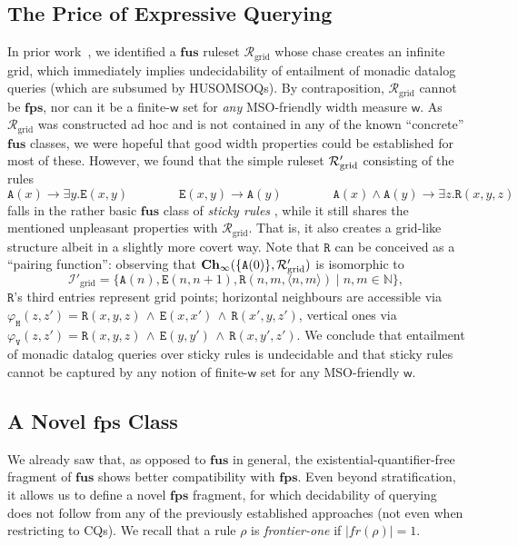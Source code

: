 \documentclass[10pt,a4paper]{amsart}
\theoremstyle{definition}
\numberwithin{equation}{section}
\providecommand{\sa}{\mathbf{Ch}_{\infty}}
\theoremstyle{plain}
\theoremstyle{definition}
\theoremstyle{myexample}
\theoremstyle{plain}
\theoremstyle{definition}
\newcommand{\instance}{\mathcal{I}}
\newcommand{\inst}{\instance}
\newcommand{\fcn}[1]{\mathsf{#1}}
\newcommand{\ruleset}{\calr}
\newcommand{\fus}{\mathbf{fus}}
\newcommand{\fps}{\mathbf{fps}} %
\newcommand{\hcs}{\fps}
\newcommand{\fhcs}{\hcs}
\renewcommand{\sa}{\mathbf{Ch}_{\infty}}
\newcommand{\calr}{\mathcal{R}}
\newcommand{\pred}[1]{\mathtt{#1}}
\newcommand{\fr}{\mathit{fr}}
\newcommand{\rpred}{\pred{R}}
\begin{document}
\subsection{The Price of Expressive Querying}\label{sec:prize}
%
In prior work~\cite{ICDT2023}, we identified a $\fus$ ruleset $\ruleset_\mathrm{grid}$  whose chase creates an infinite grid, which immediately implies undecidability of entailment of monadic datalog queries (which
are subsumed by HUSOMSOQs). By contraposition, $\ruleset_\mathrm{grid}$ cannot be $\fhcs$, nor can it be a finite-$\fcn{w}$ set for \emph{any} MSO-friendly width measure $\fcn{w}$.
As $\ruleset_\mathrm{grid}$ was constructed ad hoc and is not contained in any of the known ``concrete'' $\fus$ classes, we were hopeful that good width properties could be established for most of these.
However, we found that the simple ruleset $\ruleset'_{\smash{\mathrm{grid}}}$ consisting of the rules
$$
\pred{A}(x) \to \exists y. \pred{E}(x,\!y)
\qquad\qquad
\pred{E}(x,\!y) \to \pred{A}(y)
\qquad\qquad
\pred{A}(x) \wedge \pred{A}(y) \to \exists z. \pred{R}(x,\!y,\!z)
$$%
falls in the rather basic $\fus$ class of \emph{sticky rules} \cite{CaliGP12}, while it still shares the mentioned unpleasant properties with $\ruleset_\mathrm{grid}$. That is, it also creates a grid-like structure albeit in a slightly more covert way. Note that $\rpred$ can be conceived as a ``pairing function'': observing that  $\sa(\{\pred{A}(0)\},\ruleset'_{\smash{\mathrm{grid}}})$ is isomorphic to 
$$\inst'_\mathrm{grid} = \{ \pred{A}(n), \pred{E}(n, n{+}1), \rpred(n,m,\langle n,\!m \rangle) \mid n,m \in \mathbb{N} \},$$%
$\rpred$'s third entries represent grid points; horizontal neighbours are accessible via
{$\varphi_\pred{H}(z,\!z')=\rpred(x,\!y,\!z) {\,\wedge\,} \pred{E}(x,\!x') {\,\wedge\,} \rpred(x'\!,\!y,\!z')$}, vertical ones via
$\varphi_\pred{V}(z,\!z')=\rpred(x,\!y,\!z) {\,\wedge\,} \pred{E}(y,\!y') {\,\wedge\,} \rpred(x,\!y'\!,\!z')$. We conclude that entailment of monadic datalog queries over sticky rules is undecidable and that sticky rules cannot be captured by any notion of finite-$\fcn{w}$ set for any MSO-friendly $\fcn{w}$.   

\subsection{A Novel $\fps$ Class}
%
%
We already saw that, as opposed to $\fus$ in general, the existential-quantifier-free fragment of $\fus$ shows better compatibility with $\fhcs$. Even beyond stratification, it allows us to define a novel $\fhcs$ fragment, for which decidability of querying does not follow from any of the previously established approaches (not even when restricting to CQs). We recall that a rule $\rho$ is \emph{frontier-one} if $|\fr(\rho)|=1$. 
\end{document}
